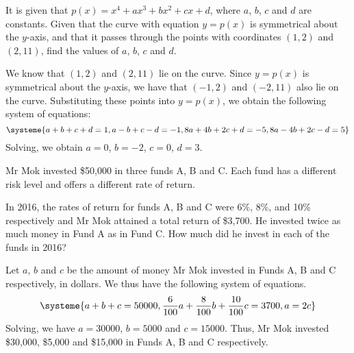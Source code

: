 \begin{problem}
    It is given that $p(x) = x^4 + ax^3 + bx^2 + cx + d$, where $a$, $b$, $c$ and $d$ are constants. Given that the curve with equation $y = p(x)$ is symmetrical about the $y$-axis, and that it passes through the points with coordinates $(1, 2)$ and $(2, 11)$, find the values of $a$, $b$, $c$ and $d$.
\end{problem}
\begin{solution}
    We know that $(1, 2)$ and $(2, 11)$ lie on the curve. Since $y = p(x)$ is symmetrical about the $y$-axis, we have that $(-1, 2)$ and $(-2, 11)$ also lie on the curve. Substituting these points into $y = p(x)$, we obtain the following system of equations:
    \[
        \systeme{
            a+b+c+d = 1,
            a-b+c-d = -1,
            8a+4b+2c+d = -5,
            8a-4b+2c-d = 5
        }
    \]
    Solving, we obtain $a = 0$, $b = -2$, $c = 0$, $d=3$.
\end{solution}

\begin{problem}
    Mr Mok invested \$50,000 in three funds A, B and C. Each fund has a different risk level and offers a different rate of return.

    In 2016, the rates of return for funds A, B and C were 6\%, 8\%, and 10\% respectively and Mr Mok attained a total return of \$3,700. He invested twice as much money in Fund A as in Fund C. How much did he invest in each of the funds in 2016?
\end{problem}
\begin{solution}
    Let $a$, $b$ and $c$ be the amount of money Mr Mok invested in Funds A, B and C respectively, in dollars. We thus have the following system of equations.
    \[
        \systeme{
            a+b+c = 50000,
            \frac{6}{100}a + \frac{8}{100}b + \frac{10}{100}c = 3700,
            a = 2c
        }
    \]
    Solving, we have $a = 30000$, $b = 5000$ and $c = 15000$. Thus, Mr Mok invested \$30,000, \$5,000 and \$15,000 in Funds A, B and C respectively.
\end{solution}

